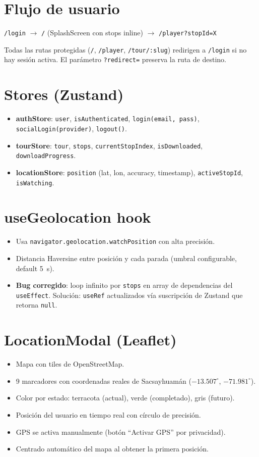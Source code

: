 \documentclass[11pt,a4paper]{article}
\begin{document}
\section{Flujo de usuario}
\begin{center}
  \texttt{/login} $\rightarrow$ \texttt{/} (SplashScreen con stops inline) $\rightarrow$ \texttt{/player?stopId=X}
\end{center}
Todas las rutas protegidas (\texttt{/}, \texttt{/player}, \texttt{/tour/:slug}) redirigen a \texttt{/login} si no hay sesión activa. El parámetro \texttt{?redirect=} preserva la ruta de destino.

\section{Stores (Zustand)}
\begin{itemize}[nosep]
  \item \textbf{authStore}: \texttt{user}, \texttt{isAuthenticated}, \texttt{login(email, pass)}, \texttt{socialLogin(provider)}, \texttt{logout()}.
  \item \textbf{tourStore}: \texttt{tour}, \texttt{stops}, \texttt{currentStopIndex}, \texttt{isDownloaded}, \texttt{downloadProgress}.
  \item \textbf{locationStore}: \texttt{position} (lat, lon, accuracy, timestamp), \texttt{activeStopId}, \texttt{isWatching}.
\end{itemize}

\section{useGeolocation hook}
\begin{itemize}[nosep]
  \item Usa \texttt{navigator.geolocation.watchPosition} con alta precisión.
  \item Distancia Haversine entre posición y cada parada (umbral configurable, default 5~s).
  \item \textbf{Bug corregido}: loop infinito por \texttt{stops} en array de dependencias del \texttt{useEffect}. Solución: \texttt{useRef} actualizados vía suscripción de Zustand que retorna \texttt{null}.
\end{itemize}

\section{LocationModal (Leaflet)}
\begin{itemize}[nosep]
  \item Mapa con tiles de OpenStreetMap.
  \item 9 marcadores con coordenadas reales de Sacsayhuamán ($-13.507^\circ$, $-71.981^\circ$).
  \item Color por estado: terracota (actual), verde (completado), gris (futuro).
  \item Posición del usuario en tiempo real con círculo de precisión.
  \item GPS se activa manualmente (botón ``Activar GPS'' por privacidad).
  \item Centrado automático del mapa al obtener la primera posición.
\end{itemize}
\end{document}
